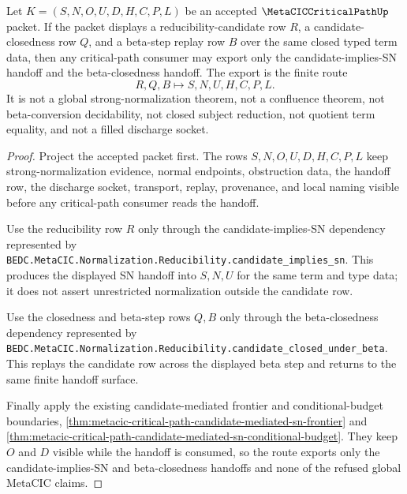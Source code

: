 \begin{theorem}
\label{thm:metacic-critical-path-candidate-sn-handoff}
Let $K=(S,N,O,U,D,H,C,P,L)$ be an accepted $\MetaCICCriticalPathUp$ packet. If the packet displays a reducibility-candidate row $R$, a candidate-closedness row $Q$, and a beta-step replay row $B$ over the same closed typed term data, then any critical-path consumer may export only the candidate-implies-SN handoff and the beta-closedness handoff. The export is the finite route
$$
R,Q,B\longmapsto S,N,U,H,C,P,L .
$$
It is not a global strong-normalization theorem, not a confluence theorem, not beta-conversion decidability, not closed subject reduction, not quotient term equality, and not a filled discharge socket.
\end{theorem}
\begin{proof}
Project the accepted packet first. The rows $S,N,O,U,D,H,C,P,L$ keep strong-normalization evidence, normal endpoints, obstruction data, the handoff row, the discharge socket, transport, replay, provenance, and local naming visible before any critical-path consumer reads the handoff.

Use the reducibility row $R$ only through the candidate-implies-SN dependency represented by \texttt{BEDC.MetaCIC.Normalization.Reducibility.candidate\_implies\_sn}. This produces the displayed SN handoff into $S,N,U$ for the same term and type data; it does not assert unrestricted normalization outside the candidate row.

Use the closedness and beta-step rows $Q,B$ only through the beta-closedness dependency represented by \texttt{BEDC.MetaCIC.Normalization.Reducibility.candidate\_closed\_under\_beta}. This replays the candidate row across the displayed beta step and returns to the same finite handoff surface.

Finally apply the existing candidate-mediated frontier and conditional-budget boundaries, \autoref{thm:metacic-critical-path-candidate-mediated-sn-frontier} and \autoref{thm:metacic-critical-path-candidate-mediated-sn-conditional-budget}. They keep $O$ and $D$ visible while the handoff is consumed, so the route exports only the candidate-implies-SN and beta-closedness handoffs and none of the refused global MetaCIC claims.
\end{proof}

